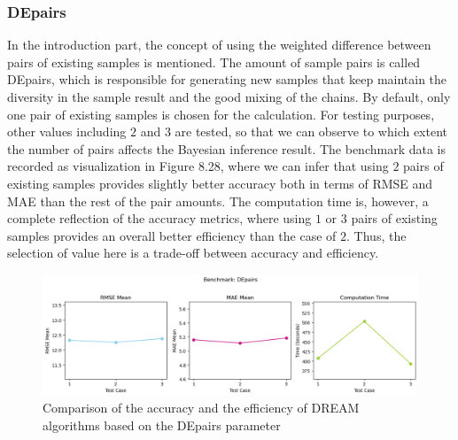\subsubsection{DEpairs}
In the introduction part, the concept of using the weighted difference between pairs of existing samples is mentioned. The amount of sample pairs is called DEpairs, which is responsible for generating new samples that keep maintain the diversity in the sample result and the good mixing of the chains. By default, only one pair of existing samples is chosen for the calculation. For testing purposes, other values including $2$ and $3$ are tested, so that we can observe to which extent the number of pairs affects the Bayesian inference result. The benchmark data is recorded as visualization in Figure 8.28, where we can infer that using $2$ pairs of existing samples provides slightly better accuracy both in terms of RMSE and MAE than the rest of the pair amounts. The computation time is, however, a complete reflection of the accuracy metrics, where using $1$ or $3$ pairs of existing samples provides an overall better efficiency than the case of $2$. Thus, the selection of value here is a trade-off between accuracy and efficiency.

\begin{figure}[H]
    \centering
    \includegraphics[width=1\textwidth]{figures/dream/DEpairs.png}
    \captionsetup{width=.8\textwidth}
    \caption{Comparison of the accuracy and the efficiency of DREAM algorithms based on the DEpairs parameter}
    \label{fig:enter-label}
\end{figure}

